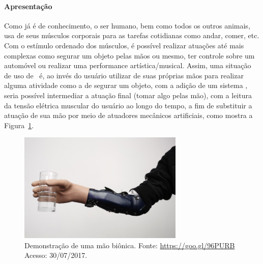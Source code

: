       \paragraph{Apresentação}
         Como já é de conhecimento, o ser humano, bem como todos os outros animais, usa de seus músculos corporais para as tarefas cotidianas como andar, comer, etc.
         Com o estímulo ordenado dos músculos, é possível realizar atuações até mais complexas como segurar um objeto pelas mãos ou mesmo, ter controle sobre um automóvel ou realizar uma performance artística/musical.
         Assim, uma situação de uso de \wearable\ é, ao invés do usuário utilizar de suas próprias mãos para realizar alguma atividade como a de segurar um objeto, com a adição de um sistema \wearable, seria possível intermediar a atuação final (tomar algo pelas mão), com a leitura da tensão elétrica muscular do usuário ao longo do tempo, a fim de substituir a atuação de sua mão por meio de atuadores mecânicos artificiais, como mostra a Figura~\ref{fig:maobionica}.

         \begin{figure}[h] \centering
            \includegraphics[width=0.7\textwidth]{img/maobionica.jpg}
            \caption{Demonstração de uma mão biônica. Fonte: \url{https://goo.gl/96PURB} Acesso: 30/07/2017.}
            \label{fig:maobionica}
         \end{figure}

